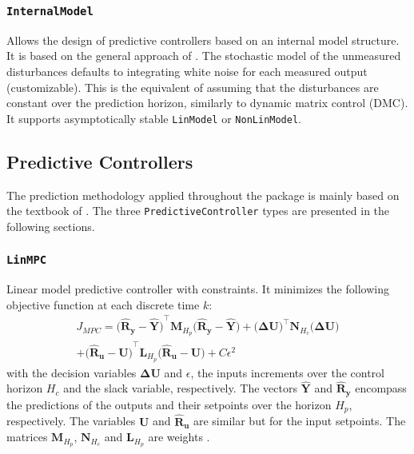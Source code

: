 \subsubsection{\textnormal{\texttt{InternalModel}}}
Allows the design of predictive controllers based on an internal model structure. It is based on the general approach of \citet{globPC}. The stochastic model of the unmeasured disturbances defaults to integrating white noise for each measured output (customizable). This is the equivalent of assuming that the disturbances are constant over the prediction horizon, similarly to dynamic matrix control (DMC). It supports asymptotically stable \texttt{LinModel} or \texttt{NonLinModel}.

\subsection{Predictive Controllers}

The prediction methodology applied throughout the package is mainly based on the textbook of \citet{mpcMac}. The three \texttt{PredictiveController} types are presented in the following sections.

\subsubsection{\textnormal{\texttt{LinMPC}}}
Linear model predictive controller with constraints. It minimizes the following objective function at each discrete time $k$:
\begin{multline}\label{eq:J_MPC}
J_{\mathit{MPC}} = 
    \mathbf{\big(\hat{R}_y - \hat{Y}\big)}^\intercal \mathbf{M}_{H_p} \mathbf{\big(\hat{R}_y - \hat{Y}\big)}   
    + \mathbf{\big(ΔU\big)}^\intercal \mathbf{N}_{H_c} \mathbf{\big(ΔU\big)} \\
    + \mathbf{\big(\hat{R}_u - U\big)}^\intercal \mathbf{L}_{H_p} \mathbf{\big(\hat{R}_u - U\big)} 
    + C \epsilon^2
\end{multline}
with the decision variables $\mathbf{ΔU}$ and $\epsilon$, the inputs increments over the control horizon $H_c$ and the slack variable, respectively. The vectors $\mathbf{\hat{Y}}$ and $\mathbf{\hat{R}_y}$ encompass the predictions of the outputs and their setpoints over the horizon $H_p$, respectively. The variables $\mathbf{U}$ and $\mathbf{\hat{R}_u}$ are similar but for the input setpoints. The matrices $\mathbf{M}_{H_p}$, $\mathbf{N}_{H_c}$ and $\mathbf{L}_{H_p}$ are  weights . 

